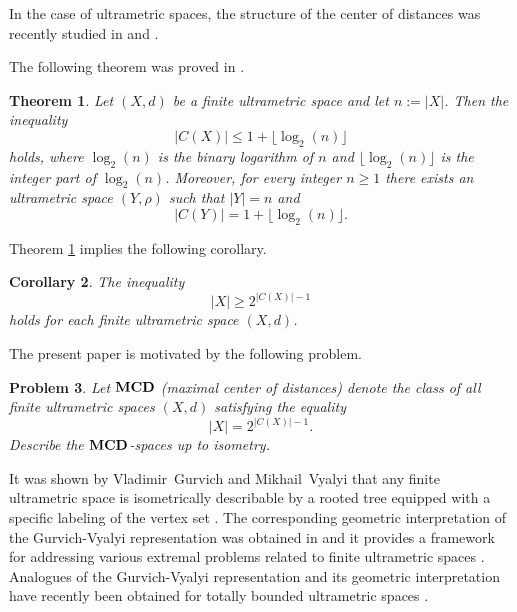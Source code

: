 \documentclass{raex}
\newtheorem{thm}{Theorem}[section]
\newtheorem{cor}[thm]{Corollary}
\newtheorem{prob}[thm]{Problem}
\theoremstyle{definition}
\theoremstyle{remark}
\numberwithin{equation}{section}
\begin{document}
In the case of ultrametric spaces, the structure of the center of distances was recently studied in \cite{DR2026MDPI} and \cite{DovgosheyRovenska2026}.


The following theorem was  proved in \cite{DovgosheyRovenska2026}.

\begin{thm}\label{ter1-1}
Let $(X,d)$ be a finite ultrametric space and let $n:=|X|$.
Then the inequality
\begin{equation*}
|C(X)| \leq 1 + \lfloor \log_2 (n) \rfloor
\end{equation*}
holds, where  $\log_2(n)$ is the binary logarithm of $n$ and  $\lfloor \log_2(n) \rfloor$ is the integer part of $\log_2(n)$. 
Moreover, for every integer $n\geq 1$ there exists an ultrametric space $(Y,\rho)$ such that $|Y|=n$
and
\begin{equation*}
|C(Y)| = 1 + \lfloor \log_2(n) \rfloor .
\end{equation*}
\end{thm}


Theorem \ref{ter1-1} implies the following corollary.
\begin{cor}
The inequality
\[
|X| \geq 2^{|C(X)|-1}
\]
holds for each finite ultrametric space $(X,d)$.
\end{cor}



The present paper is motivated by the following problem.

\begin{prob}\label{qwed}
Let $\bf MCD$ (maximal center of distances) denote the class of all finite ultrametric spaces $(X,d)$ satisfying the equality
\begin{equation*}
|X| = 2^{|C(X)|-1}. 
\end{equation*}
Describe the $\bf MCD$-spaces up to isometry.
\end{prob}





It was shown by Vladimir~Gurvich and Mikhail~Vyalyi that any finite ultrametric space is isometrically describable by a rooted tree equipped with a specific labeling of the vertex set \cite{GV2012DAM}.
 The corresponding geometric interpretation of the
Gurvich-Vyalyi representation was obtained in  \cite{PD2014JMS} and it provides a framework for addressing various
extremal problems related to finite ultrametric spaces \cite{DPT2015,DPT2017FPTA,DP2020pNUAA}. Analogues of the
Gurvich-Vyalyi representation and its geometric interpretation have recently been
obtained for totally bounded ultrametric spaces \cite{Dovg2025}.
\end{document}
